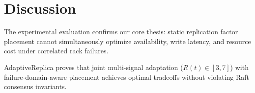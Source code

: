 \section{Discussion}
\label{sec:discussion}

The experimental evaluation confirms our core thesis: static replication factor placement cannot simultaneously optimize availability, write latency, and resource cost under correlated rack failures.

AdaptiveReplica proves that joint multi-signal adaptation ($R(t) \in [3, 7]$) with failure-domain-aware placement achieves optimal tradeoffs without violating Raft consensus invariants.
